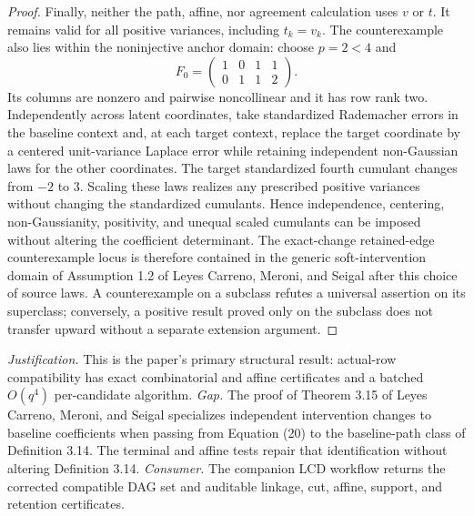 \documentclass{article}
\begin{document}
\begin{proof}
Finally, neither the path, affine, nor agreement calculation uses \(v\) or \(t\).  It remains valid for all positive variances, including \(t_k=v_k\).  The counterexample also lies within the noninjective anchor domain: choose \(p=2<4\) and
\[
 F_0=\begin{pmatrix}1&0&1&1\\0&1&1&2\end{pmatrix}.
\]
Its columns are nonzero and pairwise noncollinear and it has row rank two.  Independently across latent coordinates, take standardized Rademacher errors in the baseline context and, at each target context, replace the target coordinate by a centered unit-variance Laplace error while retaining independent non-Gaussian laws for the other coordinates.  The target standardized fourth cumulant changes from \(-2\) to \(3\).  Scaling these laws realizes any prescribed positive variances without changing the standardized cumulants.  Hence independence, centering, non-Gaussianity, positivity, and unequal scaled cumulants can be imposed without altering the coefficient determinant.  The exact-change retained-edge counterexample locus is therefore contained in the generic soft-intervention domain of Assumption 1.2 of Leyes Carreno, Meroni, and Seigal after this choice of source laws.  A counterexample on a subclass refutes a universal assertion on its superclass; conversely, a positive result proved only on the subclass does not transfer upward without a separate extension argument.
\end{proof}
\par\smallskip\noindent \textit{Justification.} This is the paper's primary structural result: actual-row compatibility has exact combinatorial and affine certificates and a batched \(O(q^4)\) per-candidate algorithm. \textit{Gap.} The proof of Theorem 3.15 of Leyes Carreno, Meroni, and Seigal specializes independent intervention changes to baseline coefficients when passing from Equation (20) to the baseline-path class of Definition 3.14. The terminal and affine tests repair that identification without altering Definition 3.14. \textit{Consumer.} The companion LCD workflow returns the corrected compatible DAG set and auditable linkage, cut, affine, support, and retention certificates.
\end{document}
